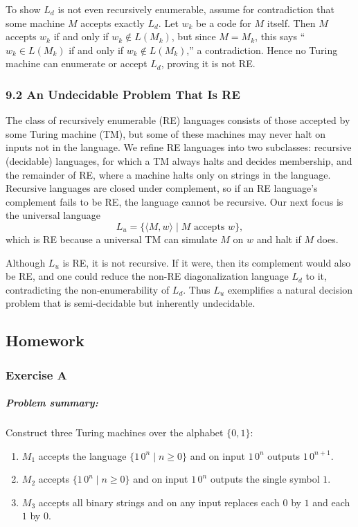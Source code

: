 \documentclass{article}
\begin{document}
To show \(L_d\) is not even recursively enumerable, assume for contradiction that some machine \(M\) accepts exactly \(L_d\). Let \(w_k\) be a code for \(M\) itself. Then \(M\) accepts \(w_k\) if and only if \(w_k\notin L(M_k)\), but since \(M=M_k\), this says “\(w_k\in L(M_k)\) if and only if \(w_k\notin L(M_k)\),” a contradiction. Hence no Turing machine can enumerate or accept \(L_d\), proving it is not RE.

\subsubsection*{9.2 An Undecidable Problem That Is RE}
The class of recursively enumerable (RE) languages consists of those accepted by some Turing machine (TM), but some of these machines may never halt on inputs not in the language. We refine RE languages into two subclasses: recursive (decidable) languages, for which a TM always halts and decides membership, and the remainder of RE, where a machine halts only on strings in the language. Recursive languages are closed under complement, so if an RE language’s complement fails to be RE, the language cannot be recursive. Our next focus is the universal language  
\[
L_u = \{\langle M,w\rangle \mid M \text{ accepts } w\},
\]
which is RE because a universal TM can simulate \(M\) on \(w\) and halt if \(M\) does.

Although \(L_u\) is RE, it is not recursive. If it were, then its complement would also be RE, and one could reduce the non-RE diagonalization language \(L_d\) to it, contradicting the non-enumerability of \(L_d\). Thus \(L_u\) exemplifies a natural decision problem that is semi-decidable but inherently undecidable.

\subsection{Homework}

\subsubsection*{Exercise A}
\subparagraph*{Problem summary:}  
Construct three Turing machines over the alphabet \(\{0,1\}\):
\begin{enumerate}
  \item \(M_1\) accepts the language \(\{1\,0^n \mid n\ge0\}\) and on input \(1\,0^n\) outputs \(1\,0^{n+1}\).
  \item \(M_2\) accepts \(\{1\,0^n \mid n\ge0\}\) and on input \(1\,0^n\) outputs the single symbol \(1\).
  \item \(M_3\) accepts all binary strings and on any input replaces each \(0\) by \(1\) and each \(1\) by \(0\).
\end{enumerate}
\end{document}
